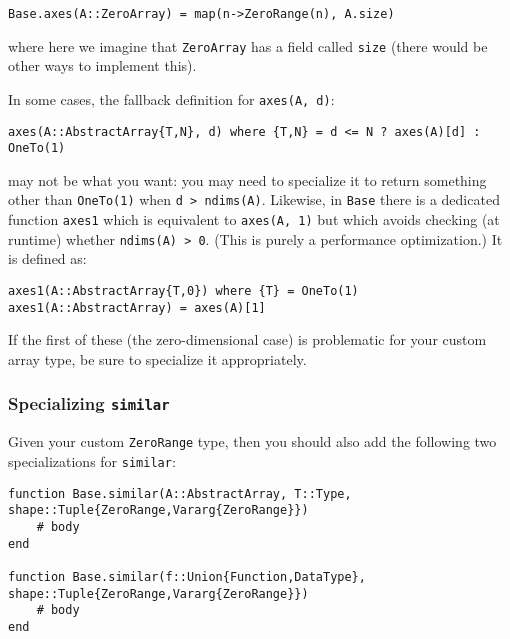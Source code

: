 \begin{verbatim}
Base.axes(A::ZeroArray) = map(n->ZeroRange(n), A.size)
\end{verbatim}



where here we imagine that \texttt{ZeroArray} has a field called \texttt{size} (there would be other ways to implement this).



In some cases, the fallback definition for \texttt{axes(A, d)}:




\begin{verbatim}
axes(A::AbstractArray{T,N}, d) where {T,N} = d <= N ? axes(A)[d] : OneTo(1)
\end{verbatim}



may not be what you want: you may need to specialize it to return something other than \texttt{OneTo(1)} when \texttt{d > ndims(A)}.  Likewise, in \texttt{Base} there is a dedicated function \texttt{axes1} which is equivalent to \texttt{axes(A, 1)} but which avoids checking (at runtime) whether \texttt{ndims(A) > 0}. (This is purely a performance optimization.)  It is defined as:




\begin{verbatim}
axes1(A::AbstractArray{T,0}) where {T} = OneTo(1)
axes1(A::AbstractArray) = axes(A)[1]
\end{verbatim}



If the first of these (the zero-dimensional case) is problematic for your custom array type, be sure to specialize it appropriately.



\hypertarget{5556461946249659648}{}


\subsubsection{Specializing \texttt{similar}}



Given your custom \texttt{ZeroRange} type, then you should also add the following two specializations for \texttt{similar}:




\begin{verbatim}
function Base.similar(A::AbstractArray, T::Type, shape::Tuple{ZeroRange,Vararg{ZeroRange}})
    # body
end

function Base.similar(f::Union{Function,DataType}, shape::Tuple{ZeroRange,Vararg{ZeroRange}})
    # body
end
\end{verbatim}



